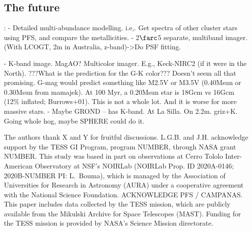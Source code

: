 \documentclass[12pt,twocolumn,tighten]{aastex63}
\begin{document}
\subsection{The future}:
- Detailed multi-abundance modelling.
  i.e,. Get spectra of other cluster stars using PFS, and compare the metallicities.
- 2$\farc$5 separate, multiband imager. (With LCOGT, 2m in Australia,
  z-band)->Do PSF fitting.

- K-band image. MagAO? Multicolor imager.
  E.g., Keck-NIRC2 (if it were in the North).
  ???What is the prediction for the G-K color???
  Doesn't seem all that promising. G-mag would predict something like
  M2.5V or M3.5V (0.40Msun or 0.30Msun from mamajek).
  At 100 Myr, a 0.20Msun star is 18Gcm vs 16Gcm (12\% inflated;
  Burrows+01). This is not a whole lot. And it is worse for more massive
  stars.
- Maybe GROND -- has K-band. At La Silla. On 2.2m.  griz+K.
  Going whole hog, maybe SPHERE could do it.




\acknowledgements
\raggedbottom

The authors thank X and Y for fruitful discussions.
%
L.G.B. and J.H. acknowledge support by the TESS GI Program, program
NUMBER, through NASA grant NUMBER.
%
This study was based in part on observations at Cerro Tololo
Inter-American Observatory at NSF's NOIRLab (NOIRLab Prop. ID
2020A-0146; 2020B-NUMBER PI: L{.}~Bouma), which is managed by the
Association of Universities for Research in Astronomy (AURA) under a
cooperative agreement with the National Science Foundation.
%
ACKNOWLEDGE PFS / CAMPANAS.
%
This paper includes data collected by the TESS mission, which are
publicly available from the Mikulski Archive for Space Telescopes
(MAST).
%
Funding for the TESS mission is provided by NASA's Science Mission
directorate.
%

%
%
\end{document}
